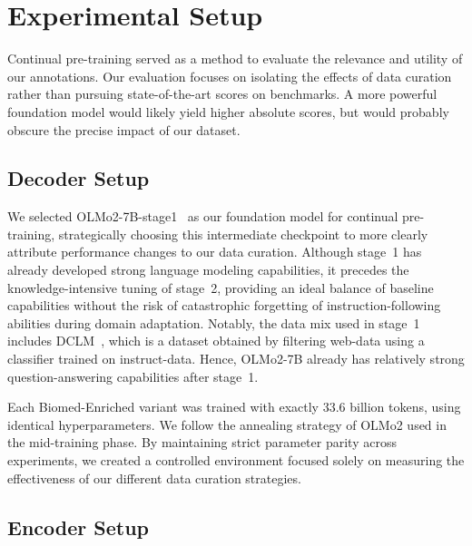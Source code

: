 \section{Experimental Setup}
\label{sec:experimental-setup}

\begin{reviewread}
Continual pre-training served as a method to evaluate the relevance and utility of our annotations. Our evaluation focuses on isolating the effects of data curation rather than pursuing state-of-the-art scores on benchmarks. A more powerful foundation model would likely yield higher absolute scores, but would probably obscure the precise impact of our dataset.
\end{reviewread}

\subsection{Decoder Setup}

\begin{reviewread}
We selected OLMo2-7B-stage1~\citep{olmo2025furious} as our foundation model for continual pre-training, strategically choosing this intermediate checkpoint to more clearly attribute performance changes to our data curation. Although stage~1 has already developed strong language modeling capabilities, it precedes the knowledge-intensive tuning of stage~2, providing an ideal balance of baseline capabilities without the risk of catastrophic forgetting of instruction-following abilities during domain adaptation. Notably, the data mix used in stage~1 includes DCLM~\citep{li2024datacomp}, which is a dataset obtained by filtering web-data using a classifier trained on instruct-data. Hence, OLMo2-7B already has relatively strong question-answering capabilities after stage~1.
\end{reviewread}

\begin{reviewread}
Each Biomed-Enriched variant was trained with exactly 33.6 billion tokens, using identical hyperparameters. We follow the annealing strategy of OLMo2 used in the mid-training phase. By maintaining strict parameter parity across experiments, we created a controlled environment focused solely on measuring the effectiveness of our different data curation strategies.
\end{reviewread}

\subsection{Encoder Setup}

